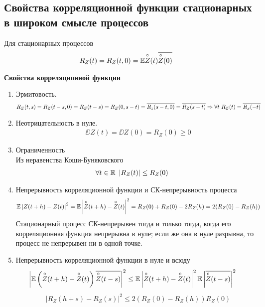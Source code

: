 \subsection{Свойства корреляционной функции стационарных в широком смысле
  процессов}
\begin{Des}
    Для стационарных процессов
    \begin{align*}
      & R_Z(t) = R_Z(t,0) = \mathbb{E}\overset{\circ}{Z}(t) \overline{\overset{\circ}{Z}(0)}
    \end{align*}
\end{Des}
\textbf{Свойства корреляционной функции}
\begin{enumerate}
    \item Эрмитовость.
    \begin{align*}
      & R_Z(t,s) = R_Z(t-s,0) = R_Z(t-s) = R_Z(0,s-t) = \overline{R_z(s-t,0)} = \overline{R_Z(s-t)} \Rightarrow \forall t \  R_Z(t) = \overline{R_x(-t)}
    \end{align*}
    \item Неотрицательность в нуле.
    \begin{align*}
      & \DD Z(t) = \DD Z(0) = R_Z(0) \geq 0
    \end{align*}
    \item Ограниченность
    \\
    Из неравенства Коши-Буняковского
    \begin{align*}
      & \forall t \in \mathbb{R} \ \left| R_Z(t) \right| \leq R_Z(0)
    \end{align*}
    \item Непрерывность корреляционной функции и СК-непрерывность процесса
    \begin{align*}
      & \mathbb{E} \left| Z(t+h)-Z(t) \right|^2 = \mathbb{E} \left| \overset{\circ}{Z}(t+h) - \overset{\circ}{Z}(t) \right|^2 = R_Z(0) + R_Z(0) -2R_Z(h) = 2(R_Z(0)-R_Z(h))
    \end{align*}
    Стационарный процесс СК-непрерывен тогда и только тогда, когда его
    корреляционная функция непрерывна в нуле; если же она в нуле разрывна, то
    процесс не непрерывен ни в одной точке.
    \item Непрерывность корреляционной функции в нуле и всюду
    \begin{align*}
      & \left| \mathbb{E} \left( \overset{\circ}{Z}(t+h)-\overset{\circ}{Z}(t) \right) \overline{\overset{\circ}{Z}(t-s)} \right|^2 \leq \mathbb{E} \left| \overset{\circ}{Z}(t+h)-\overset{\circ}{Z}(t) \right|^2 \mathbb{E} \left|\overline{\overset{\circ}{Z}(t-s)} \right|^2
    \end{align*}
    \begin{align*}
      & \left| R_Z(h+s) - R_Z(s) \right|^2 \leq 2(R_Z(0) - R_Z(h))R_Z(0)

\end{align*}
\end{enumerate}
